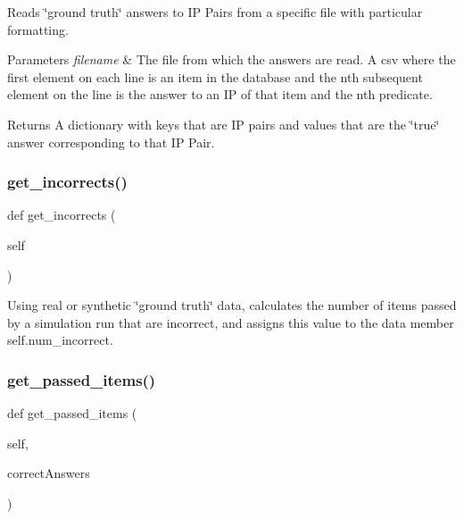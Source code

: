 Reads \char`\"{}ground truth\char`\"{} answers to IP Pairs from a specific file with particular formatting. 


\begin{DoxyParams}{Parameters}
{\em filename} & The file from which the answers are read. A csv where the first element on each line is an item in the database and the nth subsequent element on the line is the answer to an IP of that item and the nth predicate. \\
\hline
\end{DoxyParams}
\begin{DoxyReturn}{Returns}
A dictionary with keys that are IP pairs and values that are the \char`\"{}true\char`\"{} answer corresponding to that IP Pair. 
\end{DoxyReturn}
\mbox{\label{classdynamicfilterapp_1_1test__simulations_1_1_simulation_test_a9adfa8688f12473b0c394cd3b7237be0}} 
\subsubsection{\texorpdfstring{get\_incorrects()}{get\_incorrects()}}
{\footnotesize\ttfamily def get\+\_\+incorrects (\begin{DoxyParamCaption}\item[{}]{self }\end{DoxyParamCaption})}



Using real or synthetic \char`\"{}ground truth\char`\"{} data, calculates the number of items passed by a simulation run that are incorrect, and assigns this value to the data member self.\+num\+\_\+incorrect. 

\mbox{\label{classdynamicfilterapp_1_1test__simulations_1_1_simulation_test_a7c7a6eb7abd732121d6b150823fbd1d2}} 
\subsubsection{\texorpdfstring{get\_passed\_items()}{get\_passed\_items()}}
{\footnotesize\ttfamily def get\+\_\+passed\+\_\+items (\begin{DoxyParamCaption}\item[{}]{self,  }\item[{}]{correct\+Answers }\end{DoxyParamCaption})}



